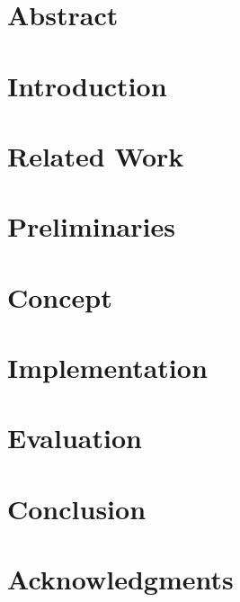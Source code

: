 \documentclass[a4paper,11pt,twoside]{pads-thesis}
\begin{document}

\gTitlePage

\chapter*{Abstract} 


\tableofcontents

\cleardoublepage
\pagestyle{fancy}

\chapter{Introduction} \label{chap:intro}


\chapter{Related Work} \label{chap:related_work}


\chapter{Preliminaries} \label{chap:prelim}


\chapter{Concept} \label{chap:concecpt}


\chapter{Implementation} \label{chap:impl}


\chapter{Evaluation} \label{chap:eval}


\chapter{Conclusion} \label{chap:conclusion}



\chapter*{Acknowledgments}


\end{document}
